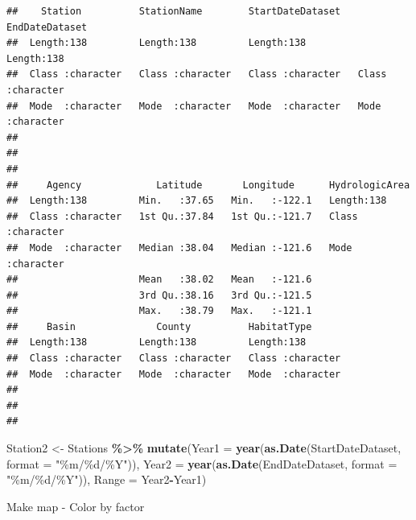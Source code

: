 \documentclass[
]{book}
\newenvironment{Shaded}{\begin{snugshade}}{\end{snugshade}}
\newcommand{\DataTypeTok}[1]{\textcolor[rgb]{0.13,0.29,0.53}{#1}}
\newcommand{\KeywordTok}[1]{\textcolor[rgb]{0.13,0.29,0.53}{\textbf{#1}}}
\newcommand{\NormalTok}[1]{#1}
\newcommand{\OperatorTok}[1]{\textcolor[rgb]{0.81,0.36,0.00}{\textbf{#1}}}
\newcommand{\StringTok}[1]{\textcolor[rgb]{0.31,0.60,0.02}{#1}}
\begin{document}
\begin{verbatim}
##    Station          StationName        StartDateDataset   EndDateDataset    
##  Length:138         Length:138         Length:138         Length:138        
##  Class :character   Class :character   Class :character   Class :character  
##  Mode  :character   Mode  :character   Mode  :character   Mode  :character  
##                                                                             
##                                                                             
##                                                                             
##     Agency             Latitude       Longitude      HydrologicArea    
##  Length:138         Min.   :37.65   Min.   :-122.1   Length:138        
##  Class :character   1st Qu.:37.84   1st Qu.:-121.7   Class :character  
##  Mode  :character   Median :38.04   Median :-121.6   Mode  :character  
##                     Mean   :38.02   Mean   :-121.6                     
##                     3rd Qu.:38.16   3rd Qu.:-121.5                     
##                     Max.   :38.79   Max.   :-121.1                     
##     Basin              County          HabitatType       
##  Length:138         Length:138         Length:138        
##  Class :character   Class :character   Class :character  
##  Mode  :character   Mode  :character   Mode  :character  
##                                                          
##                                                          
## 
\end{verbatim}

\begin{Shaded}
\begin{Highlighting}[]
\NormalTok{Station2 \textless{}{-}}\StringTok{ }\NormalTok{Stations }\OperatorTok{\%\textgreater{}\%}
\StringTok{  }\KeywordTok{mutate}\NormalTok{(}\DataTypeTok{Year1 =} \KeywordTok{year}\NormalTok{(}\KeywordTok{as.Date}\NormalTok{(StartDateDataset, }\DataTypeTok{format =} \StringTok{"\%m/\%d/\%Y"}\NormalTok{)),}
         \DataTypeTok{Year2 =} \KeywordTok{year}\NormalTok{(}\KeywordTok{as.Date}\NormalTok{(EndDateDataset, }\DataTypeTok{format =} \StringTok{"\%m/\%d/\%Y"}\NormalTok{)),}
         \DataTypeTok{Range =}\NormalTok{ Year2}\OperatorTok{{-}}\NormalTok{Year1)}
\end{Highlighting}
\end{Shaded}

Make map - Color by factor
\end{document}
